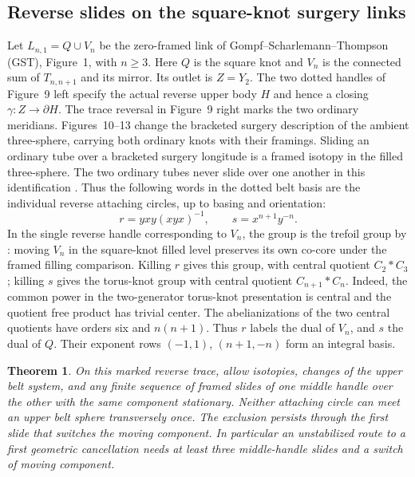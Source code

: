 \documentclass[11pt,letterpaper]{article}
\numberwithin{equation}{section}
\newtheorem{theorem}{Theorem}[section]
\theoremstyle{remark}
\begin{document}
\subsection{Reverse slides on the square-knot surgery links}\label{sec:gst-reverse}
Let \(L_{n,1}=Q\cup V_n\) be the zero-framed link of
Gompf--Scharlemann--Thompson (GST), Figure~1, with \(n\ge3\).
Here \(Q\) is the square knot and \(V_n\) is the connected sum of
\(T_{n,n+1}\) and its mirror. Its outlet is \(Z=Y_2\).
The two dotted handles of Figure~9 left specify the actual reverse
upper body \(H\) and hence a closing \(\gamma:Z\to\partial H\).
The trace reversal in Figure~9 right marks the two ordinary meridians.
Figures~10--13 change the bracketed surgery description of the ambient
three-sphere, carrying both ordinary knots with their framings. Sliding
an ordinary tube over a bracketed surgery longitude is a framed isotopy
in the filled three-sphere. The two ordinary tubes never slide over
one another in this identification
\cite[\S7, Figures 9--13 and equation following Question 2]{GompfScharlemannThompson2010}.
Thus the following words in the dotted belt basis are the individual
reverse attaching circles, up to basing and orientation:
\[
 r=yxy(xyx)^{-1},\qquad s=x^{n+1}y^{-n}.
\]
In the single reverse handle corresponding to \(V_n\), the group
is the trefoil group by \cite[Lemma 7.1]{Scharlemann2012PropertyTwoRSlope}:
moving \(V_n\) in the square-knot filled level preserves its own
co-core under the framed filling comparison. Killing \(r\) gives this
group, with central quotient \(C_2*C_3\); killing \(s\) gives the
torus-knot group with central quotient \(C_{n+1}*C_n\). Indeed, the
common power in the two-generator torus-knot presentation is central
and the quotient free product has trivial center. The abelianizations
of the two central quotients have orders six and \(n(n+1)\).
Thus \(r\) labels the dual of \(V_n\), and \(s\) the dual of \(Q\).
Their exponent rows \((-1,1)\), \((n+1,-n)\) form an integral basis.

\begin{theorem}\label{thm:gst-fixed-slides}
On this marked reverse trace, allow isotopies, changes of the upper
belt system, and any finite sequence of framed slides of one middle
handle over the other with the same component stationary. Neither
attaching circle can meet an upper belt sphere transversely once.
The exclusion persists through the first slide that switches the moving
component. In particular an unstabilized route to a first geometric
cancellation needs at least three middle-handle slides and a switch
of moving component.
\end{theorem}
\end{document}
